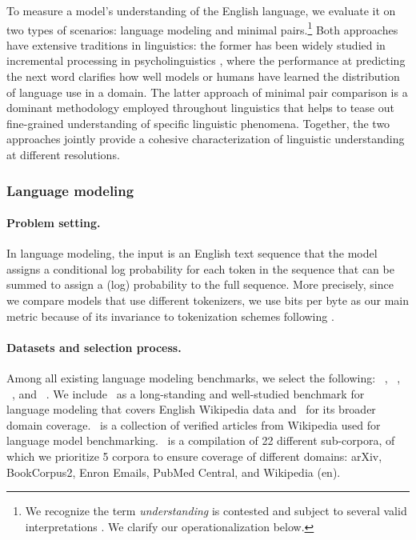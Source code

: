 To measure a model's understanding of the English language, we evaluate it on two types of scenarios: language modeling and minimal pairs.\footnote{We recognize the term \textit{understanding} is contested and subject to several valid interpretations \citep[see][\S2.6]{bommasani2021opportunities}. We clarify our operationalization below.}
Both approaches have extensive traditions in linguistics: the former has been widely studied in incremental processing in psycholinguistics \citep{hale2001probabilistic, levy2008expectation}, where the performance at predicting the next word clarifies how well models or humans have learned the distribution of language use in a domain.
The latter approach of minimal pair comparison is a dominant methodology employed throughout linguistics \citep{chomsky1957syntactic} that helps to tease out fine-grained understanding of specific linguistic phenomena.
Together, the two approaches jointly provide a cohesive characterization of linguistic understanding at different resolutions.

\subsubsection{Language modeling}
\label{sec:language-modeling}

\paragraph{Problem setting.}
In language modeling, the input is an English text sequence that the model assigns a conditional log probability for each token in the sequence that can be summed to assign a (log) probability to the full sequence.
More precisely, since we compare models that use different tokenizers, we use bits per byte as our main metric because of its invariance to tokenization schemes following \citet{gao2021thepile}.

\paragraph{Datasets and selection process.} 
Among all existing language modeling benchmarks, we select the following: \wikitext~\citep{merity2016pointer}, \pile~\citep{gao2021thepile},  \twitteraae~\citep{blodgett2016}, and \ice~\citep[The International Corpus of English;][]{Greenbaum1991-js}. 
We include \wikitext~as a long-standing and well-studied benchmark for language modeling that covers English Wikipedia data and
\pile~for its broader domain coverage.
\wikitext~is a collection of verified articles from Wikipedia used for language model benchmarking.
\pile~is a compilation of 22 different sub-corpora, of which we prioritize 5 corpora to ensure coverage of different domains: arXiv, BookCorpus2, Enron Emails, PubMed Central, and Wikipedia (en).

